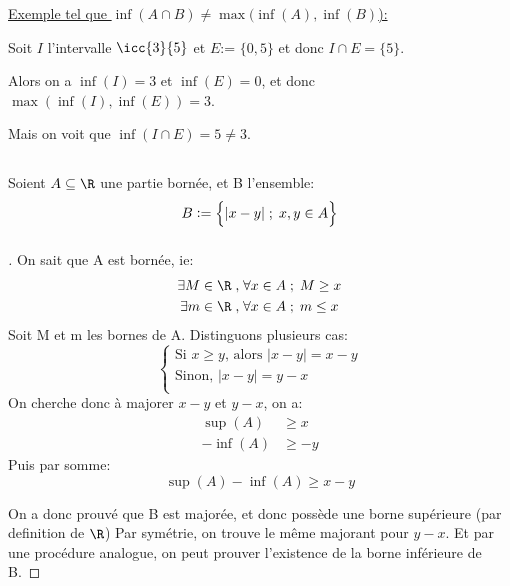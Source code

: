 \underline{Exemple tel que \(\inf(A \cap B) \neq \max(\inf(A), \inf(B)\)):}\<

Soit \(I\) l'intervalle \(\icc{3}{5}\) et \(E\):= \(\bigl\{ 0, 5\bigl\}\)  et donc \(I \cap E = \bigl\{ 5 \bigl\}\).

Alors on a \(\inf(I) = 3\) et \(\inf(E) = 0\), et donc \(\max(\inf(I), \inf(E)) = 3\). 

Mais on voit que \(\inf(I \cap E) = 5 \neq 3\).
\pagebreak

\subsection[Ecart d'un ensemble]{}
Soient \(A \subseteq \R \) une partie bornée, et B l'ensemble:
\[
B:= \Bigl\{ |x - y| \; ; \; x, y \in A \Bigl\}
\]
\subsubsection*{}
\begin{proof}[\unskip\nopunct]
On sait que A est bornée, ie:
\begin{align*}
   \exists M \in \R\; , \; &\forall x \in A \; ; \; M \geq x \\
   \exists m \in \R\; , \; &\forall x \in A \; ; \; m \leq x \\
\end{align*}
Soit M et m les bornes de A. Distinguons plusieurs cas:
\[
   \begin{cases}
      \text{Si } x \geq y \text{, alors } |x - y| = x - y\\
      \text{Sinon, } |x - y| = y - x\\
   \end{cases}
\]
On cherche donc à majorer \(x - y\) et \(y - x\), on a:
\begin{align*}
   \sup(A) &\geq x\\
   -\inf(A) &\geq -y
\end{align*}
Puis par somme:
\[
      \sup(A) - \inf(A) \geq x - y 
\]

On a donc prouvé que B est majorée, et donc possède une borne supérieure (par definition de \(\R\))
Par symétrie, on trouve le même majorant pour \(y - x\). Et par une procédure analogue, on peut prouver l'existence de la borne inférieure de B. 
\end{proof}
